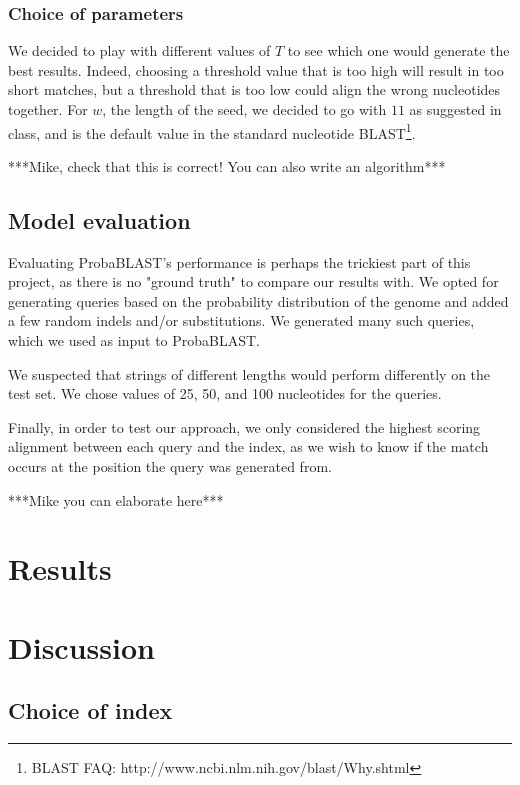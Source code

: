 \documentclass[12pt]{article}%
\begin{document}
\subsubsection{Choice of parameters}

We decided to play with different values of $T$ to see which one would generate the best results. Indeed, choosing a threshold value that is too high will result in too short matches, but a threshold that is too low could align the wrong nucleotides together.
For $w$, the length of the seed, we decided to go with $11$ as suggested in class, and is the default value in the standard nucleotide BLAST\footnote{BLAST FAQ: http://www.ncbi.nlm.nih.gov/blast/Why.shtml}.


***Mike, check that this is correct! You can also write an algorithm***

\subsection{Model evaluation}

Evaluating ProbaBLAST's performance is perhaps the trickiest part of this project, as there is no "ground truth" to compare our results with. We opted for generating queries based on the probability distribution of the genome and added a few random indels and/or substitutions. We generated many such queries, which we used as input to ProbaBLAST.

We suspected that strings of different lengths would perform differently on the test set. We chose values of 25, 50, and 100 nucleotides for the queries. 

Finally, in order to test our approach, we only considered the highest scoring alignment between each query and the index, as we wish to know if the match occurs at the position the query was generated from.


***Mike you can elaborate here***

\section{Results}



\section{Discussion}

\subsection{Choice of index}
\end{document}
